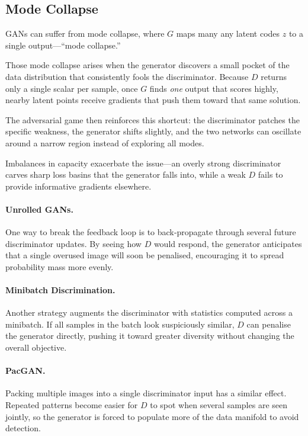 \documentclass{article}
\begin{document}
\subsection{Mode Collapse}
GANs can suffer from mode collapse, where $G$ maps many any latent codes $z$ to a single output—“mode collapse.”  

Those mode collapse arises when the generator discovers a small pocket of the data distribution that consistently fools the discriminator. Because \(D\) returns only a single scalar per sample, once \(G\) finds \emph{one} output that scores highly, nearby latent points receive gradients that push them toward that same solution.  

The adversarial game then reinforces this shortcut: the discriminator patches the specific weakness, the generator shifts slightly, and the two networks can oscillate around a narrow region instead of exploring all modes.  

Imbalances in capacity exacerbate the issue—an overly strong discriminator carves sharp loss basins that the generator falls into, while a weak \(D\) fails to provide informative gradients elsewhere.

\paragraph{Unrolled GANs.}
One way to break the feedback loop is to back‑propagate through several future discriminator updates.  
By seeing how \(D\) would respond, the generator anticipates that a single overused image will soon be penalised, encouraging it to spread probability mass more evenly.

\paragraph{Minibatch Discrimination.}
Another strategy augments the discriminator with statistics computed across a minibatch.  
If all samples in the batch look suspiciously similar, \(D\) can penalise the generator directly, pushing it toward greater diversity without changing the overall objective.

\paragraph{PacGAN.}
Packing multiple images into a single discriminator input has a similar effect.  
Repeated patterns become easier for \(D\) to spot when several samples are seen jointly, so the generator is forced to populate more of the data manifold to avoid detection.
\end{document}
